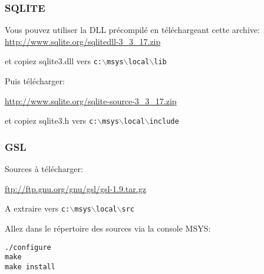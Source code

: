% 
% 
% 
% 
% 
% 
% 

\subsubsection{SQLITE}
Vous pouvez utiliser la DLL précompilé en téléchargeant cette archive:
\url{http://www.sqlite.org/sqlitedll-3\_3\_17.zip}

et copiez sqlite3.dll vers \texttt{c:$\backslash$msys$\backslash$local$\backslash$lib}

Puis télécharger:

\url{http://www.sqlite.org/sqlite-source-3\_3\_17.zip}

et copiez sqlite3.h vers \texttt{c:$\backslash$msys$\backslash$local$\backslash$include}

% 
% 
% 
% 
\subsubsection{GSL}
Sources à télécharger:

\url{ftp://ftp.gnu.org/gnu/gsl/gsl-1.9.tar.gz}

A extraire vers \texttt{c:$\backslash$msys$\backslash$local$\backslash$src}

Allez dans le répertoire des sources via la console MSYS:

\begin{verbatim}
./configure
make
make install
\end{verbatim}

